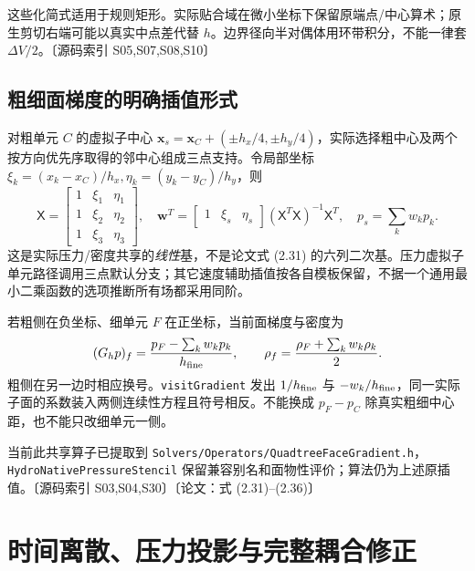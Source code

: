 \documentclass[UTF8,a4paper,11pt,fontset=fandol]{ctexart}
\newcommand{\code}[1]{\nolinkurl{#1}}
\newcommand{\src}[1]{\textcolor{ink}{\small〔源码索引 #1〕}}
\newcommand{\thesis}[1]{\textcolor{ink}{\small〔论文：#1〕}}
\newcommand{\mat}[1]{\mathsf{#1}}
\begin{document}
这些化简式适用于规则矩形。实际贴合域在微小坐标下保留原端点/中心算术；原生剪切右端可能以真实中点差代替 $h$。边界径向半对偶体用环带积分，不能一律套 $\Delta V/2$。\src{S05,S07,S08,S10}

\subsection{粗细面梯度的明确插值形式}
对粗单元 $C$ 的虚拟子中心 $\bm x_s=\bm x_C+(\pm h_x/4,\pm h_y/4)$，实际选择粗中心及两个按方向优先序取得的邻中心组成三点支持。令局部坐标 $\xi_k=(x_k-x_C)/h_x,\eta_k=(y_k-y_C)/h_y$，则
\begin{equation}
 \mat X=\begin{bmatrix}1&\xi_1&\eta_1\\1&\xi_2&\eta_2\\1&\xi_3&\eta_3\end{bmatrix},\quad
 \bm w^T=\begin{bmatrix}1&\xi_s&\eta_s\end{bmatrix}
 (\mat X^T\mat X)^{-1}\mat X^T,
 \quad p_s=\sum_kw_kp_k.
\end{equation}
这是实际压力/密度共享的\emph{线性}基，不是论文式 (2.31) 的六列二次基。压力虚拟子单元路径调用三点默认分支；其它速度辅助插值按各自模板保留，不据一个通用最小二乘函数的选项推断所有场都采用同阶。

若粗侧在负坐标、细单元 $F$ 在正坐标，当前面梯度与密度为
\begin{equation}
 (G_hp)_f=\frac{p_F-\sum_kw_kp_k}{h_{\rm fine}},\qquad
 \rho_f=\frac{\rho_F+\sum_kw_k\rho_k}{2}.
\end{equation}
粗侧在另一边时相应换号。\code{visitGradient} 发出 $1/h_{\rm fine}$ 与 $-w_k/h_{\rm fine}$，同一实际子面的系数装入两侧连续性方程且符号相反。不能换成 $p_F-p_C$ 除真实粗细中心距，也不能只改细单元一侧。

当前此共享算子已提取到 \code{Solvers/Operators/QuadtreeFaceGradient.h}，\code{HydroNativePressureStencil} 保留兼容别名和面物性评价；算法仍为上述原插值。\src{S03,S04,S30}\thesis{式 (2.31)--(2.36)}


\section{时间离散、压力投影与完整耦合修正}
\end{document}
